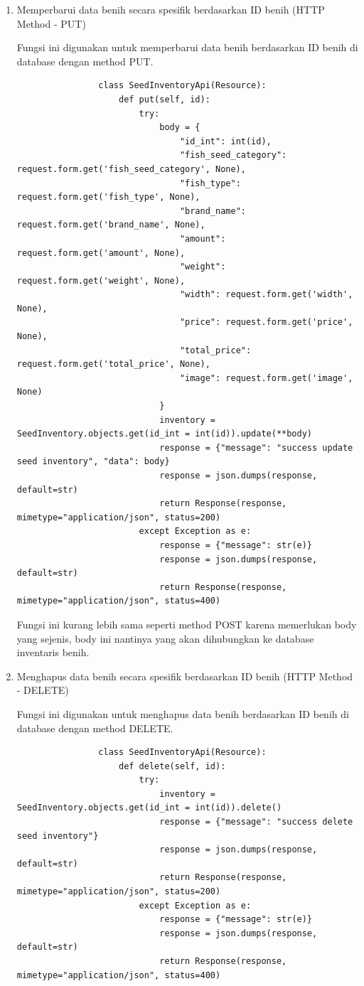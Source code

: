 \begin{spacing}{1.5}
\begin{enumerate}
\begin{enumerate}
			\item Memperbarui data benih secara spesifik berdasarkan ID benih (HTTP Method - PUT)
			
			Fungsi ini digunakan untuk memperbarui data benih berdasarkan ID benih di database dengan method PUT.
			
			\begin{lstlisting}
				class SeedInventoryApi(Resource):
					def put(self, id):
						try:
							body = {
								"id_int": int(id),
								"fish_seed_category": request.form.get('fish_seed_category', None),
								"fish_type": request.form.get('fish_type', None),
								"brand_name": request.form.get('brand_name', None),
								"amount": request.form.get('amount', None),
								"weight": request.form.get('weight', None),
								"width": request.form.get('width', None),
								"price": request.form.get('price', None),
								"total_price": request.form.get('total_price', None),
								"image": request.form.get('image', None)
							}
							inventory = SeedInventory.objects.get(id_int = int(id)).update(**body)
							response = {"message": "success update seed inventory", "data": body}
							response = json.dumps(response, default=str)
							return Response(response, mimetype="application/json", status=200)
						except Exception as e:
							response = {"message": str(e)}
							response = json.dumps(response, default=str)
							return Response(response, mimetype="application/json", status=400)
			\end{lstlisting}

			Fungsi ini kurang lebih sama seperti method POST karena memerlukan body yang sejenis, body ini nantinya yang akan dihubungkan ke database inventaris benih.

			\item Menghapus data benih secara spesifik berdasarkan ID benih (HTTP Method - DELETE)
			
			Fungsi ini digunakan untuk menghapus data benih berdasarkan ID benih di database dengan method DELETE.
			
			\begin{lstlisting}
				class SeedInventoryApi(Resource):
					def delete(self, id):
						try:
							inventory = SeedInventory.objects.get(id_int = int(id)).delete()
							response = {"message": "success delete seed inventory"}
							response = json.dumps(response, default=str)
							return Response(response, mimetype="application/json", status=200)
						except Exception as e:
							response = {"message": str(e)}
							response = json.dumps(response, default=str)
							return Response(response, mimetype="application/json", status=400)
			\end{lstlisting}
		\end{enumerate}


\end{enumerate}
\end{spacing}
